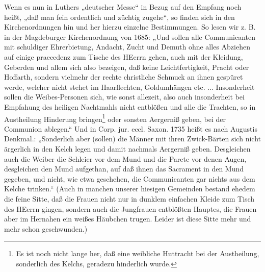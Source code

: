 Wenn es nun in Luthers „deutscher Messe“ in Bezug auf den Empfang noch heißt, „daß man fein ordentlich und züchtig zugehe“, so finden sich in den Kirchenordnungen hin und her hierzu einzelne Bestimmungen. So lesen wir z. B. in der Magdeburger Kirchenordnung von 1685: „Und sollen alle Communicanten mit schuldiger Ehrerbietung, Andacht, Zucht und Demuth ohne alles Abziehen auf einige praecedenz zum Tische des HEerrn gehen, auch mit der Kleidung, Geberden und allem sich also bezeigen, daß keine Leichtfertigkeit, Pracht oder Hoffarth, sondern vielmehr der rechte christliche Schmuck an ihnen gespüret werde, welcher nicht stehet im Haarflechten, Goldumhängen etc. ... Insonderheit sollen die Weibes-Personen sich, wie sonst allezeit, also auch insonderheit bei Empfahung des heiligen Nachtmahls nicht entblößen und alle
die Trachten, so in Austheilung Hinderung bringen\footnote{Es ist noch nicht lange her, daß eine weibliche Huttracht bei der Austheilung, sonderlich des Kelchs, geradezu hinderlich wurde.} oder sonsten Aergerniß geben, bei der Communion ablegen.“ Und in Corp. jur. eccl. Saxon. 1735 heißt es nach Augustis Denkmal.: „Sonderlich aber (sollen) die Männer mit ihren Zwick-Bärten sich nicht ärgerlich in den Kelch legen und damit nachmals Aergerniß geben. Desgleichen auch die Weiber die Schleier vor dem Mund und die Parete vor denen Augen, desgleichen den Mund aufgethan, auf daß ihnen das Sacrament in den Mund gegeben, und nicht, wie etwa geschehen, die Communicanten gar nichts aus dem Kelche trinken.“ (Auch in manchen unserer hiesigen Gemeinden bestand ehedem die feine Sitte, daß die Frauen nicht nur in dunklem einfachen Kleide zum Tisch des HEerrn gingen, sondern auch die Jungfrauen entblößten Hauptes, die Frauen aber im Hernahen ein weißes Häubchen trugen. Leider ist diese Sitte mehr und mehr schon geschwunden.)

